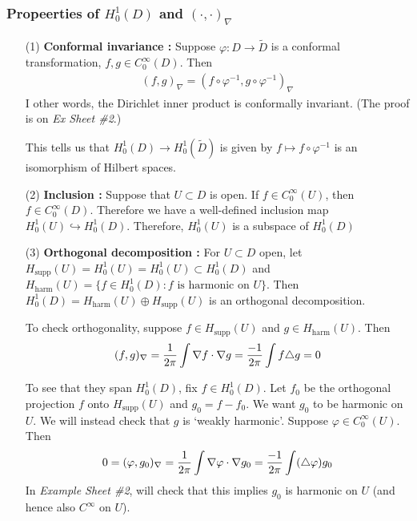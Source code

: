 \documentclass[12pt,a4paper]{article}
\newenvironment{proof}
{\begin{changemargin}{0.5cm}{0.5cm} 
	}%
	{\end{changemargin}
}
\newenvironment{p}
{\begin{proof} 
	}%
	{\end{proof}
}
\begin{document}
\subsubsection*{Propeerties of $H_0^1(D)$ and $(\cdot, \cdot)_{\nabla}$}

\begin{itemize}
\item[(1)] \textbf{Conformal invariance :} Suppose $\varphi : D \rightarrow \tilde{D}$ is a conformal transformation, $f, g\in C_0^{\infty}(D)$. Then
\begin{align*}
(f,g)_{\nabla} = (f\circ \varphi^{-1}, g\circ \varphi^{-1})_{\nabla}
\end{align*}
I other words, the Dirichlet inner product is conformally invariant. (The proof is on \emph{Ex Sheet \#2}.)

\quad This tells us that $H_0^1(D) \rightarrow H_0^1(\tilde{D})$ is given by $f \mapsto f\circ \varphi^{-1}$ is an isomorphism of Hilbert spaces.

\item[(2)] \textbf{Inclusion :} Suppose that $U\subset D$ is open. If $f\in C_0^{\infty}(U)$, then $f\in C_0^{\infty}(D)$. Therefore we have a well-defined inclusion map $H_0^1(U) \hookrightarrow H_0^1(D)$. Therefore, $H_0^1(U)$ is a subspace of $H_0^1(D)$ 

\item[(3)] \textbf{Orthogonal decomposition :} For $U\subset D$ open, let $H_{\text{supp}}(U) = H_0^1(U) = H_0^1(U) \subset H_0^1(D)$ and $H_{\text{harm}}(U) = \{ f\in H_0^1(D) : f\text{ is harmonic on } U \}$. Then $H_0^1(D) = H_{\text{harm}}(U) \oplus H_{\text{supp}}(U)$ is an orthogonal decomposition.
\begin{p}
\pf To check orthogonality, suppose $f\in H_{\text{supp}}(U)$ and $g\in H_{\text{harm}}(U)$. Then
\begin{align*}
(f,g)_{\nabla} = \frac{1}{ 2\pi } \int \nabla f \cdot \nabla g = \frac{-1}{2\pi} \int f \triangle g =0
\end{align*}

To see that they span $H_0^1(D)$, fix $f\in H_0^1(D)$. Let $f_0$ be the orthogonal projection $f$ onto $H_{\text{supp}}(U)$ and $g_0 = f- f_0$. We want $g_0$ to be harmonic on $U$. We will instead check that $g$ is `weakly harmonic'. Suppose $\varphi \in C_0^{\infty}(U)$. Then 
\begin{align*}
0 =(\varphi, g_0)_{\nabla} = \frac{1}{2\pi} \int \nabla \varphi \cdot \nabla g_0 = \frac{-1}{2\pi} \int (\triangle \varphi) g_0 
\end{align*}
In \emph{Example Sheet \#2}, will check that this implies $g_0$ is harmonic on $U$ (and hence also $C^{\infty}$ on $U$).

\eop
\end{p}
\end{itemize}
\s
\end{document}
